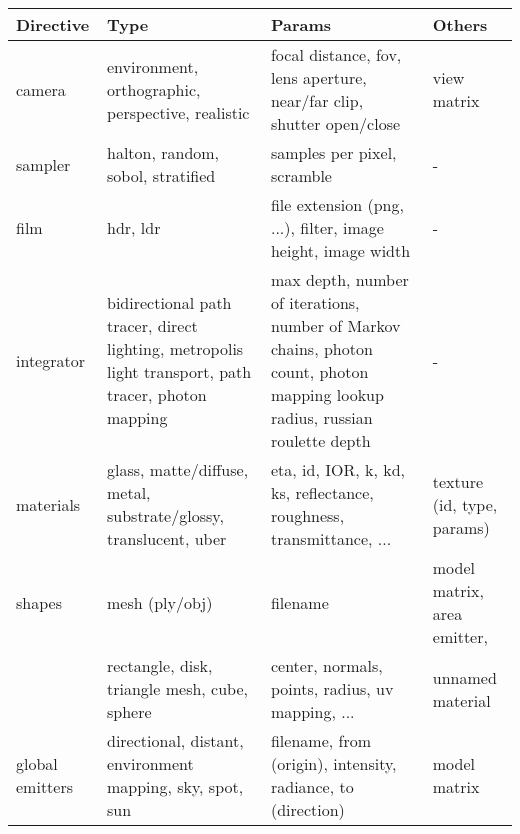 \scriptsize
\begin{center}
    \begin{tabular}{ | L{1cm} | L{2.2cm} | L{2.2cm} | L{1.4cm} | }
    \hline
    Directive & Type & Params & Others \\ 
    \hline
    camera & environment, orthographic, perspective, realistic & focal distance, fov, lens aperture, near/far clip, shutter open/close & view matrix \\
    \hline
    sampler & halton, random, sobol, stratified & samples per pixel, scramble & - \\
    \hline
    film & hdr, ldr & file extension (png, ...), filter, image height, image width & - \\
    \hline
    integrator & bidirectional path tracer, direct lighting, metropolis light transport, path tracer, photon mapping & max depth, number of iterations, number of Markov chains, photon count, photon mapping lookup radius, russian roulette depth & - \\
    \hline
    materials & glass, matte/diffuse, metal, substrate/glossy, translucent, uber & eta, id, IOR, k, kd, ks, reflectance, roughness, transmittance, ... & texture (id, type, params) \\ 
    \hline
    shapes & mesh (ply/obj) & filename & model matrix, area emitter, \\
	   & rectangle, disk, triangle mesh, cube, sphere & center, normals, points, radius, uv mapping, ... & unnamed material\\
    \hline
    global emitters & directional, distant, environment mapping, sky, spot, sun & filename, from (origin), intensity, radiance, to (direction) & model matrix \\
    \hline

    \end{tabular}
\end{center}
\normalsize    